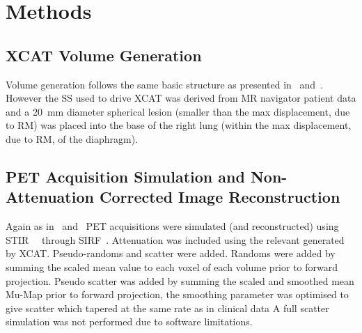         \section{Methods} \label{sec:comparison_of_motion_correction_methods_incorporating_motion_modelling_for_pet/ct_using_a_single_breath_hold_attenuation_map_methods}
            \subsection{XCAT Volume Generation} \label{sec:comparison_of_motion_correction_methods_incorporating_motion_modelling_for_pet/ct_using_a_single_breath_hold_attenuation_map_xcat_volume_generation}
                Volume generation follows the same basic structure as presented in~ and~. However the \gls{SS} used to drive \gls{XCAT} was derived from \gls{MR} navigator patient data and a \SI{20}{\milli\metre} diameter spherical lesion (smaller than the max displacement, due to \gls{RM}) was placed into the base of the right lung (within the max displacement, due to \gls{RM}, of the diaphragm).
            
            \subsection{PET Acquisition Simulation and Non-Attenuation Corrected Image Reconstruction} \label{sec:comparison_of_motion_correction_methods_incorporating_motion_modelling_for_pet/ct_using_a_single_breath_hold_attenuation_map_pet_acquisition_simulation_and_non_attenuation_corrected_image_reconstruction}
                Again as in~ and~ \gls{PET} acquisitions were simulated (and reconstructed) using \gls{STIR}~~ through \gls{SIRF}~. Attenuation was included using the relevant  generated by \gls{XCAT}. Pseudo-randoms and scatter were added. Randoms were added by summing the scaled mean value to each voxel of each volume prior to forward projection. Pseudo scatter was added by summing the scaled and smoothed mean \gls{Mu-Map} prior to forward projection, the smoothing parameter was optimised to give scatter which tapered at the same rate as in clinical data A full scatter simulation was not performed due to software limitations.
                
